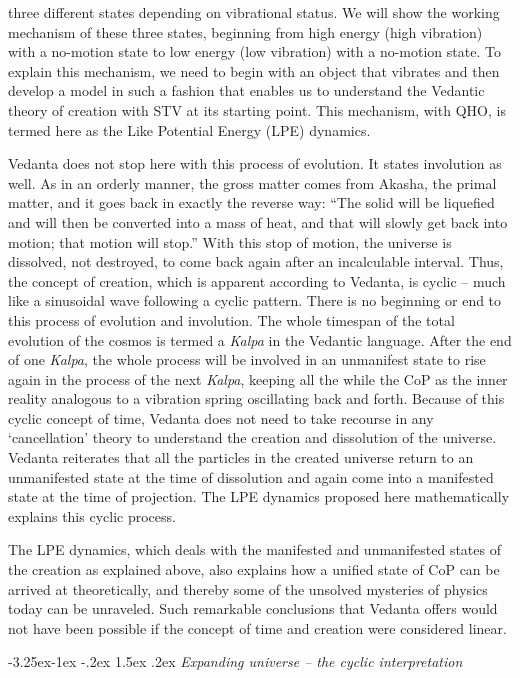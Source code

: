 \documentclass[twoside, 13pt]{article}
\makeatletter
\renewcommand\subsubsection{\@startsection{subsubsection}{3}{\z@}%
                                     {-3.25ex\@plus -1ex \@minus -.2ex}%
                                     {1.5ex \@plus .2ex}%
                                     {\normalfont\large\bfseries}}
\makeatother
\begin{document}
{{three different states depending on vibrational status. We will show the working mechanism of these three states, beginning from high energy (high vibration) with a no-motion state to low energy (low vibration) with a no-motion state. To explain this mechanism, we need to begin with an object that vibrates and then develop a model in such a fashion that enables us to understand the Vedantic theory of creation with STV at its starting point. This mechanism, with QHO, is termed here as the Like Potential Energy (LPE) dynamics. 

Vedanta does not stop here with this process of evolution. It states involution as well. As in an orderly manner, the gross matter comes from Akasha, the primal matter, and it goes back in exactly the reverse way: “The solid will be liquefied and will then be converted into a mass of heat, and that will slowly get back into motion; that motion will stop.” With this stop of motion, the universe is dissolved, not destroyed, to come back again after an incalculable interval. Thus, the concept of creation, which is apparent according to Vedanta, is cyclic – much like a sinusoidal wave following a cyclic pattern. There is no beginning or end to this process of evolution and involution. The whole timespan of the total evolution of the cosmos is termed a \textit{Kalpa} in the Vedantic language. After the end of one \textit{Kalpa}, the whole process will be involved in an unmanifest state to rise again in the process of the next \textit{Kalpa}, keeping all the while the CoP as the inner reality analogous to a vibration spring oscillating back and forth. Because of this cyclic concept of time, Vedanta does not need to take recourse in any ‘cancellation’ theory to understand the creation and dissolution of the universe. Vedanta reiterates that all the particles in the created universe return to an unmanifested state at the time of dissolution and again come into a manifested state at the time of projection. The LPE dynamics proposed here mathematically explains this cyclic process.

The LPE dynamics, which deals with the manifested and unmanifested states of the creation as explained above, also explains how a unified state of CoP can be arrived at theoretically, and thereby some of the unsolved mysteries of physics today can be unraveled. Such remarkable conclusions that Vedanta offers would not have been possible if the concept of time and creation were considered linear.} 

{\fontsize{8}{10}\selectfont\subsubsection{\textit{Expanding universe – the cyclic interpretation}}}\label{subsubsec-2.2.1}

}
\end{document}
